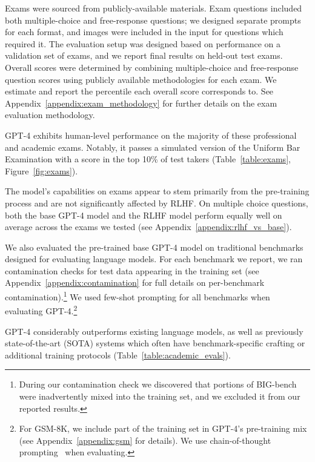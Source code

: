 \documentclass{article}
\begin{document}
Exams were sourced from publicly-available materials. Exam questions included both multiple-choice and free-response questions; we designed separate prompts for each format, and images were included in the input for questions which required it. The evaluation setup was designed based on performance on a validation set of exams, and we report final results on held-out test exams. Overall scores were determined by combining multiple-choice and free-response question scores using publicly available methodologies for each exam. We estimate and report the percentile each overall score corresponds to.
See Appendix~\ref{appendix:exam_methodology} for further details on the exam evaluation methodology.

GPT-4 exhibits human-level performance on the majority of these professional and academic exams. Notably, it passes a simulated version of the Uniform Bar Examination with a score in the top 10\% of test takers (Table~\ref{table:exams}, Figure~\ref{fig:exams}). 


The model's capabilities on exams appear to stem primarily from the pre-training process and are not significantly affected by RLHF. On multiple choice questions, both the base GPT-4 model and the RLHF model perform equally well on average across the exams we tested (see Appendix~\ref{appendix:rlhf_vs_base}).

We also evaluated the pre-trained base GPT-4 model on traditional benchmarks designed for evaluating language models. For each benchmark we report, we ran contamination checks for test data appearing in the training set (see Appendix~\ref{appendix:contamination} for full details on per-benchmark contamination).\footnote{During our contamination check we discovered that portions of BIG-bench~\citep{srivastava2022beyond} were inadvertently mixed into the training set, and we excluded it from our reported results.} We used few-shot prompting \citep{brown2020language} for all benchmarks when evaluating GPT-4.\footnote{For GSM-8K, we include part of the training set in GPT-4's pre-training mix (see Appendix~\ref{appendix:gsm} for details). We use chain-of-thought prompting~\citep{wei2022chain} when evaluating.}

GPT-4 considerably outperforms existing language models, as well as previously state-of-the-art (SOTA) systems which
often have benchmark-specific crafting or additional training protocols (Table~\ref{table:academic_evals}).
\end{document}
